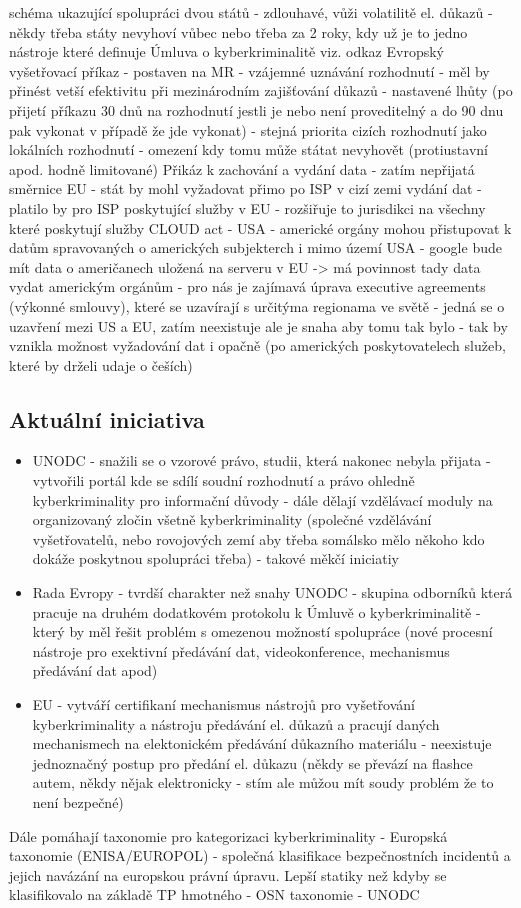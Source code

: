 schéma ukazující spolupráci dvou států - zdlouhavé, vůži volatilitě el. důkazů - někdy třeba státy
nevyhoví vůbec nebo třeba za 2 roky, kdy už je to jedno
nástroje které definuje Úmluva o kyberkriminalitě viz. odkaz
Evropský vyšetřovací příkaz - postaven na MR - vzájemné uznávání rozhodnutí - měl by přinést
vetší efektivitu při mezinárodním zajišťování důkazů - nastavené lhůty (po přijetí příkazu 30 dnů
na rozhodnutí jestli je nebo není proveditelný a do 90 dnu pak vykonat v případě že jde vykonat) -
stejná priorita cizích rozhodnutí jako lokálních rozhodnutí - omezení kdy tomu může státat
nevyhovět (protiustavní apod. hodně limitované)
Přikáz k zachování a vydání data - zatím nepřijatá směrnice EU - stát by mohl vyžadovat přimo
po ISP v cizí zemi vydání dat - platilo by pro ISP poskytující služby v EU - rozšiřuje to jurisdikci na
všechny které poskytují služby
CLOUD act - USA - americké orgány mohou přistupovat k datům spravovaných o amerických
subjekterch i mimo území USA - google bude mít data o američanech uložená na serveru v EU ->
má povinnost tady data vydat americkým orgánům - pro nás je zajímavá úprava executive
agreements (výkonné smlouvy), které se uzavírají s určitýma regionama ve světě - jedná se o
uzavření mezi US a EU, zatím neexistuje ale je snaha aby tomu tak bylo - tak by vznikla možnost
vyžadování dat i opačně (po amerických poskytovatelech služeb, které by drželi udaje o češích)

\subsection{Aktuální iniciativa}
\begin{itemize}
    \item UNODC - snažili se o vzorové právo, studii, která nakonec nebyla přijata - vytvořili portál kde
se sdílí soudní rozhodnutí a právo ohledně kyberkriminality pro informační důvody - dále
dělají vzdělávací moduly na organizovaný zločin všetně kyberkriminality (společné vzdělávání
vyšetřovatelů, nebo rovojových zemí aby třeba somálsko mělo někoho kdo dokáže
poskytnou spolupráci třeba) - takové měkčí iniciatiy
    \item Rada Evropy - tvrdší charakter než snahy UNODC - skupina odborníků která pracuje na
druhém dodatkovém protokolu k Úmluvě o kyberkriminalitě - který by měl řešit
problém s omezenou možností spolupráce (nové procesní nástroje pro exektivní předávání
dat, videokonference, mechanismus předávání dat apod)
    \item EU - vytváří certifikaní mechanismus nástrojů pro vyšetřování kyberkriminality a nástroju
předávání el. důkazů a pracují daných mechanismech na elektonickém předávání důkazního
materiálu - neexistuje jednoznačný postup pro předání el. důkazu (někdy se převází na
flashce autem, někdy nějak elektronicky - stím ale můžou mít soudy problém že to není
bezpečné)
\end{itemize}
Dále pomáhají taxonomie pro kategorizaci kyberkriminality - Europská taxonomie
(ENISA/EUROPOL) - společná klasifikace bezpečnostních incidentů a jejich navázání na europskou
právní úpravu. Lepší statiky než kdyby se klasifikovalo na základě TP hmotného - OSN taxonomie -
UNODC
